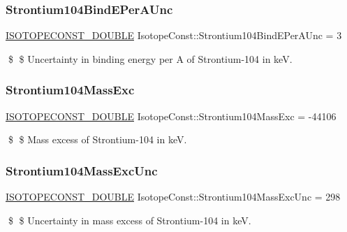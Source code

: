 \subsubsection{\texorpdfstring{Strontium104\+Bind\+E\+Per\+A\+Unc}{Strontium104BindEPerAUnc}}
{\footnotesize\ttfamily \mbox{\hyperlink{group___isotope_const-_macros_ga8f45a7272ce02c0b4c65c44636ed719a}{I\+S\+O\+T\+O\+P\+E\+C\+O\+N\+S\+T\+\_\+\+D\+O\+U\+B\+LE}} Isotope\+Const\+::\+Strontium104\+Bind\+E\+Per\+A\+Unc = 3}

\$ \$ Uncertainty in binding energy per A of Strontium-\/104 in keV. \mbox{\label{group___isotope_const-_strontium-_sr104_gafcc305d074aba67984958bd7ea9c2eea}} 
\subsubsection{\texorpdfstring{Strontium104\+Mass\+Exc}{Strontium104MassExc}}
{\footnotesize\ttfamily \mbox{\hyperlink{group___isotope_const-_macros_ga8f45a7272ce02c0b4c65c44636ed719a}{I\+S\+O\+T\+O\+P\+E\+C\+O\+N\+S\+T\+\_\+\+D\+O\+U\+B\+LE}} Isotope\+Const\+::\+Strontium104\+Mass\+Exc = -\/44106}

\$ \$ Mass excess of Strontium-\/104 in keV. \mbox{\label{group___isotope_const-_strontium-_sr104_gaa31e098b386477b888ebaba9935ac003}} 
\subsubsection{\texorpdfstring{Strontium104\+Mass\+Exc\+Unc}{Strontium104MassExcUnc}}
{\footnotesize\ttfamily \mbox{\hyperlink{group___isotope_const-_macros_ga8f45a7272ce02c0b4c65c44636ed719a}{I\+S\+O\+T\+O\+P\+E\+C\+O\+N\+S\+T\+\_\+\+D\+O\+U\+B\+LE}} Isotope\+Const\+::\+Strontium104\+Mass\+Exc\+Unc = 298}

\$ \$ Uncertainty in mass excess of Strontium-\/104 in keV. \mbox{\label{group___isotope_const-_strontium-_sr104_ga59431b5420a1393b381db6addf1fe1cd}} 

